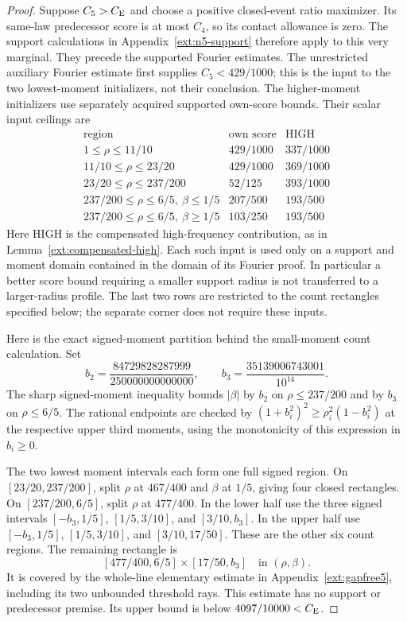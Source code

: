 \begin{proof}
Suppose $C_5>C_{\mathrm E}$ and choose a positive closed-event ratio maximizer.
Its same-law predecessor score is at most $C_4$, so its contact
allowance is zero. The support calculations in
Appendix~\ref{ext:n5-support} therefore apply to this very marginal.
They precede the supported Fourier estimates. The unrestricted
auxiliary Fourier estimate first supplies $C_5<429/1000$; this is
the input to the two lowest-moment initializers, not their conclusion.
The higher-moment initializers use separately acquired supported
own-score bounds. Their scalar input ceilings are
\[
\begin{array}{c|cc}
\text{region}&\text{own score}&\text{HIGH}\\\hline
1\le\rho\le11/10&429/1000&337/1000\\
11/10\le\rho\le23/20&429/1000&369/1000\\
23/20\le\rho\le237/200&52/125&393/1000\\
237/200\le\rho\le6/5,\ \beta\le1/5&207/500&193/500\\
237/200\le\rho\le6/5,\ \beta\ge1/5&103/250&193/500
\end{array}
\]
Here HIGH is the compensated high-frequency contribution, as in
Lemma~\ref{ext:compensated-high}. Each such input is used only on a
support and moment domain contained in the domain of its Fourier
proof. In particular a better score bound requiring a smaller support
radius is not transferred to a larger-radius profile.
The last two rows are restricted to the count rectangles specified below;
the separate corner does not require these inputs.

Here is the exact signed-moment partition behind the small-moment
count calculation. Set
\[
 b_2=\frac{84729828287999}{250000000000000},\qquad
 b_3=\frac{35139006743001}{10^{14}}.
\]
The sharp signed-moment inequality bounds $|\beta|$ by $b_2$ on
$\rho\le237/200$ and by $b_3$ on $\rho\le6/5$.
The rational endpoints are checked by
$(1+b_i^2)^2\ge\rho_i^2(1-b_i^2)$ at the respective upper
third moments, using the monotonicity of this expression in $b_i\ge0$.

The two lowest moment intervals each form one full signed region.
On $[23/20,237/200]$, split $\rho$ at $467/400$ and $\beta$ at
$1/5$, giving four closed rectangles. On $[237/200,6/5]$, split
$\rho$ at $477/400$. In the lower half use the three signed intervals
$[-b_3,1/5]$, $[1/5,3/10]$, and $[3/10,b_3]$. In the upper half
use $[-b_3,1/5]$, $[1/5,3/10]$, and $[3/10,17/50]$.
These are the other six count regions. The remaining rectangle is
\begin{equation}\label{ext:five-corner-domain}
 [477/400,6/5]\times[17/50,b_3]
 \quad\text{in }(\rho,\beta).
\end{equation}
It is covered by the whole-line elementary estimate in
Appendix~\ref{ext:gapfree5}, including its two
unbounded threshold rays. This estimate has no support or predecessor
premise. Its upper bound is below $4097/10000<C_{\mathrm E}$.


\end{proof}
